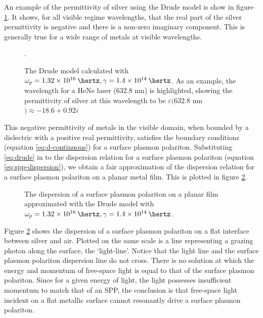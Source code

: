 An example of the permittivity of silver using the Drude model is show in figure \ref{fig:drude}. It shows, for all visible regime wavelengths, that the real part of the silver permittivity is negative and there is a non-zero imaginary component. This is generally true for a wide range of metals at visible wavelengths.
\begin{figure}
\begin{center}

\caption[The Drude model for silver calculated with $\omega_p=1.32\times 10^{16}\:\hertz, \gamma=1.4\times 10^{14}\:\hertz$.]{\label{fig:drude}The Drude model calculated with $\omega_p=1.32\times 10^{16}\:\hertz, \gamma=1.4\times 10^{14}\:\hertz$. As an example, the wavelength for a HeNe laser (632.8 nm) is highlighted, showing the permittivity of silver at this wavelength to be $\varepsilon(632.8$ nm$) \approx -18.6+0.92i$}.
\end{center}
\end{figure}
This negative permittivity of metals in the visible domain, when bounded by a dielectric with a positive real permittivity, satisfies the boundary conditions (equation \ref{eq:d-continuous}) for a surface plasmon polariton. Substituting \ref{eq:drude} in to the dispersion relation for a surface plasmon polariton  (equation \ref{eq:spp-dispersion}), we obtain a fair approximation of the dispersion relation for a surface plasmon polariton on a planar metal film. This is plotted in figure \ref{fig:spp-dispersion}.
\begin{figure}
\begin{center}

\caption[The dispersion of a surface plasmon polariton on a planar film approximated with the Drude mode.]{\label{fig:spp-dispersion}The dispersion of a surface plasmon polariton on a planar film approximated with the Drude model with $\omega_p=1.32\times 10^{16}\:\hertz, \gamma=1.4\times 10^{14} \:\hertz$.}
\end{center}
\end{figure}
Figure \ref{fig:spp-dispersion} shows the dispersion of a surface plasmon polariton on a flat interface between silver and air. Plotted on the same scale is a line representing a grazing photon along the surface, the `light-line'.  Notice that the light line and the surface plasmon polariton dispersion line do not cross. There is no solution at which the energy and momentum of free-space light is equal to that of the surface plasmon polariton. Since for a given energy of light, the light possesses insufficient momentum to match that of an SPP, the conclusion is that free-space light incident on a flat metallic surface cannot resonantly drive a surface plasmon polariton. 



